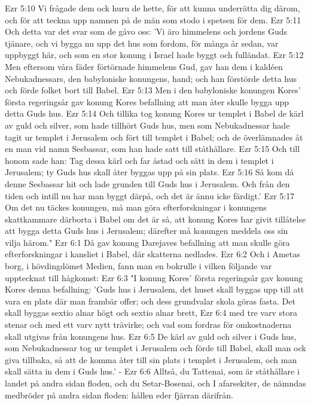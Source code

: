 Ezr 5:10  Vi frågade dem ock huru de hette, för att kunna underrätta dig därom, och för att teckna upp namnen på de män som stodo i spetsen för dem.
Ezr 5:11  Och detta var det svar som de gåvo oss: 'Vi äro himmelens och jordens Guds tjänare, och vi bygga nu upp det hus som fordom, för många år sedan, var uppbyggt här, och som en stor konung i Israel hade byggt och fulländat.
Ezr 5:12  Men eftersom våra fäder förtörnade himmelens Gud, gav han dem i kaldéen Nebukadnessars, den babyloniske konungens, hand; och han förstörde detta hus och förde folket bort till Babel.
Ezr 5:13  Men i den babyloniske konungen Kores' första regeringsår gav konung Kores befallning att man åter skulle bygga upp detta Guds hus.
Ezr 5:14  Och tillika tog konung Kores ur templet i Babel de kärl av guld och silver, som hade tillhört Guds hus, men som Nebukadnessar hade tagit ur templet i Jerusalem och fört till templet i Babel; och de överlämnades åt en man vid namn Sesbassar, som han hade satt till ståthållare.
Ezr 5:15  Och till honom sade han: Tag dessa kärl och far åstad och sätt in dem i templet i Jerusalem; ty Guds hus skall åter byggas upp på sin plats.
Ezr 5:16  Så kom då denne Sesbassar hit och lade grunden till Guds hus i Jerusalem. Och från den tiden och intill nu har man byggt därpå, och det är ännu icke färdigt.'
Ezr 5:17  Om det nu täckes konungen, må man göra efterforskningar i konungens skattkammare därborta i Babel om det är så, att konung Kores har givit tillåtelse att bygga detta Guds hus i Jerusalem; därefter må konungen meddela oss sin vilja härom."
Ezr 6:1  Då gav konung Darejaves befallning att man skulle göra efterforskningar i kansliet i Babel, där skatterna nedlades.
Ezr 6:2  Och i Ametas borg, i hövdingdömet Medien, fann man en bokrulle i vilken följande var upptecknat till hågkomst:
Ezr 6:3  "I konung Kores' första regeringsår gav konung Kores denna befallning: 'Guds hus i Jerusalem, det huset skall byggas upp till att vara en plats där man frambär offer; och dess grundvalar skola göras fasta. Det skall byggas sextio alnar högt och sextio alnar brett,
Ezr 6:4  med tre varv stora stenar och med ett varv nytt trävirke; och vad som fordras för omkostnaderna skall utgivas från konungens hus.
Ezr 6:5  De kärl av guld och silver i Guds hus, som Nebukadnessar tog ur templet i Jerusalem och förde till Babel, skall man ock giva tillbaka, så att de komma åter till sin plats i templet i Jerusalem, och man skall sätta in dem i Guds hus.' -
Ezr 6:6  Alltså, du Tattenai, som är ståthållare i landet på andra sidan floden, och du Setar-Bosenai, och I afarsekiter, de nämndas medbröder på andra sidan floden: hållen eder fjärran därifrån.
